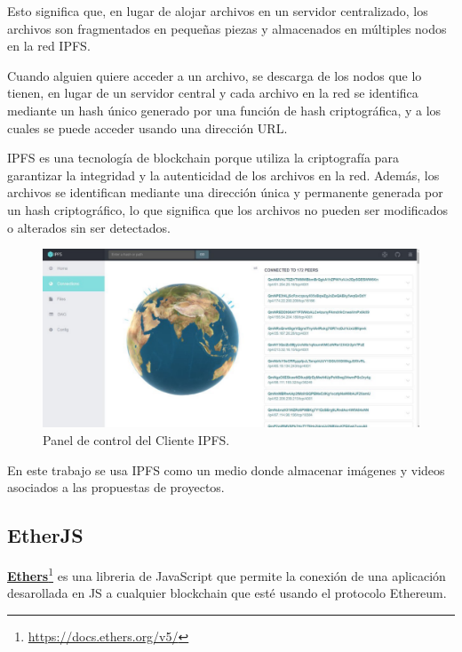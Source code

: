 \bigskip

Esto significa que, en lugar de alojar archivos en un servidor centralizado, los archivos son fragmentados en pequeñas piezas y almacenados en múltiples nodos en la red IPFS.

\bigskip

Cuando alguien quiere acceder a un archivo, se descarga de los nodos que lo tienen, en lugar de un servidor central y cada archivo en la red se identifica mediante un hash único generado por una función de hash criptográfica, y a los cuales se puede acceder usando una dirección URL.

\bigskip

IPFS es una tecnología de blockchain porque utiliza la criptografía para garantizar la integridad y la autenticidad de los archivos en la red. Además, los archivos se identifican mediante una dirección única y permanente generada por un hash criptográfico, lo que significa que los archivos no pueden ser modificados o alterados sin ser detectados.

\bigskip

\begin{figure}[H]
        \centering
        \includegraphics[width=1\textwidth]{img/capturas/ipfs.png}
        \caption{Panel de control del Cliente IPFS.}
        \label{fig:configApi}
\end{figure}

En este trabajo se usa IPFS como un medio donde almacenar imágenes y videos asociados a las propuestas de proyectos.

\newpage

\subsection{EtherJS}

\textcolor{blue}{\href{https://docs.ethers.org/v5/}{\textbf{Ethers}}}\footnote{\url{https://docs.ethers.org/v5/}} es una libreria de JavaScript que permite la conexión de una aplicación desarollada en JS a cualquier blockchain que esté usando el protocolo Ethereum.

